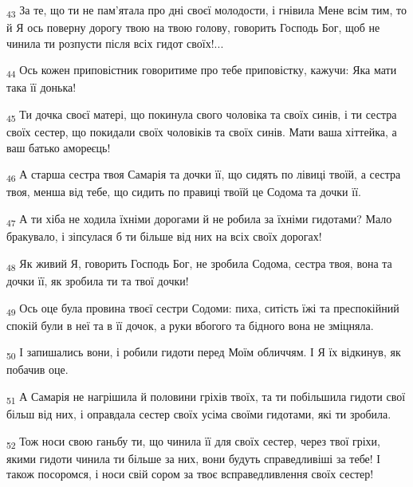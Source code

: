 \begin{tcolorbox}
\textsubscript{43} За те, що ти не пам'ятала про дні своєї молодости, і гнівила Мене всім тим, то й Я ось поверну дорогу твою на твою голову, говорить Господь Бог, щоб не чинила ти розпусти після всіх гидот своїх!...
\end{tcolorbox}
\begin{tcolorbox}
\textsubscript{44} Ось кожен приповістник говоритиме про тебе приповістку, кажучи: Яка мати така її донька!
\end{tcolorbox}
\begin{tcolorbox}
\textsubscript{45} Ти дочка своєї матері, що покинула свого чоловіка та своїх синів, і ти сестра своїх сестер, що покидали своїх чоловіків та своїх синів. Мати ваша хіттейка, а ваш батько амореєць!
\end{tcolorbox}
\begin{tcolorbox}
\textsubscript{46} А старша сестра твоя Самарія та дочки її, що сидять по лівиці твоїй, а сестра твоя, менша від тебе, що сидить по правиці твоїй це Содома та дочки її.
\end{tcolorbox}
\begin{tcolorbox}
\textsubscript{47} А ти хіба не ходила їхніми дорогами й не робила за їхніми гидотами? Мало бракувало, і зіпсулася б ти більше від них на всіх своїх дорогах!
\end{tcolorbox}
\begin{tcolorbox}
\textsubscript{48} Як живий Я, говорить Господь Бог, не зробила Содома, сестра твоя, вона та дочки її, як зробила ти та твої дочки!
\end{tcolorbox}
\begin{tcolorbox}
\textsubscript{49} Ось оце була провина твоєї сестри Содоми: пиха, ситість їжі та преспокійний спокій були в неї та в її дочок, а руки вбогого та бідного вона не зміцняла.
\end{tcolorbox}
\begin{tcolorbox}
\textsubscript{50} І запишались вони, і робили гидоти перед Моїм обличчям. І Я їх відкинув, як побачив оце.
\end{tcolorbox}
\begin{tcolorbox}
\textsubscript{51} А Самарія не нагрішила й половини гріхів твоїх, та ти побільшила гидоти свої більш від них, і оправдала сестер своїх усіма своїми гидотами, які ти зробила.
\end{tcolorbox}
\begin{tcolorbox}
\textsubscript{52} Тож носи свою ганьбу ти, що чинила її для своїх сестер, через твої гріхи, якими гидоти чинила ти більше за них, вони будуть справедливіші за тебе! І також посоромся, і носи свій сором за твоє всправедливлення своїх сестер!
\end{tcolorbox}
